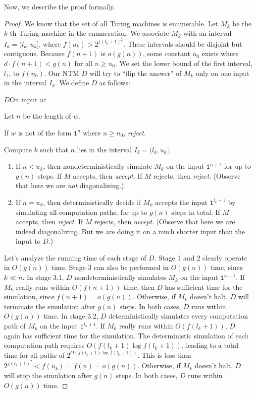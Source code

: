 \documentclass[11pt,twoside=off,numbers=noenddot]{scrbook}
\begin{document}
Now, we describe the proof formally.

\begin{proof}
  We know that the set of all Turing machines is enumerable. Let $M_k$ be the $k$-th Turing machine in the enumeration. We associate $M_k$ with an interval $I_k = (l_k, u_k]$, where $f(u_k) > 2^{f(l_k + 1)^2}$. These intervals should be disjoint but contiguous. Because $f(n + 1)$ is $o(g(n))$, some constant $n_0$ exists where $d \cdot f(n + 1) < g(n)$ for all $n \geq n_0$. We set the lower bound of the first interval, $l_1$, to $f(n_0)$. Our NTM $D$ will try to ``flip the answer'' of $M_k$ only on one input in the interval $I_k$. We define $D$ as follows:

  \begin{turing}{$D$}{On input $w$:}
  \item Let $n$ be the length of $w$.
  \item If $w$ is not of the form $\texttt{1}^n$ where $n \geq n_0$, \emph{reject}.
  \item Compute $k$ such that $n$ lies in the interval $I_k = (l_k, u_k]$.
    \begin{enumerate}[label=\theenumi.\arabic*.]
      \item If $n < u_k$, then nondeterministically simulate $M_k$ on the input $\texttt{1}^{n + 1}$ for up to $g(n)$ steps. If $M$ accepts, then \emph{accept}. If $M$ rejects, then \emph{reject}. (Observe that here we are \emph{not} diagonalizing.)
      \item If $n = u_k$, then deterministically decide if $M_k$ accepts the input $\texttt{1}^{l_k + 1}$ by simulating all computation paths, for up to $g(n)$ steps in total. If $M$ accepts, then \emph{reject}. If $M$ rejects, then \emph{accept}. (Observe that here we are indeed diagonalizing. But we are doing it on a much shorter input than the input to $D$.)
    \end{enumerate}
  \end{turing}

  Let's analyze the running time of each stage of $D$. Stage 1 and 2 clearly operate in $O(g(n))$ time. Stage 3 can also be performed in $O(g(n))$ time, since $k \ll n$. In stage 3.1, $D$ nondeterministically simulates $M_k$ on the input $\texttt{1}^{n + 1}$. If $M_k$ really runs within $O(f(n + 1))$ time, then $D$ has sufficient time for the simulation, since $f(n + 1) = o(g(n))$. Otherwise, if $M_k$ doesn't halt, $D$ will terminate the simulation after $g(n)$ steps. In both cases, $D$ runs within $O(g(n))$ time. In stage 3.2, $D$ deterministically simulates every computation path of $M_k$ on the input $\texttt{1}^{l_k + 1}$. If $M_k$ really runs within $O(f(l_k + 1))$, $D$ again has sufficient time for the simulation. The deterministic simulation of each computation path requires $O(f(l_k + 1) \log f(l_k + 1))$, leading to a total time for all paths of $2^{O(f(l_k + 1) \log f(l_k + 1))}$. This is less than $2^{f(l_k + 1)^2} < f(u_k) = f(n) = o(g(n))$. Otherwise, if $M_k$ doesn't halt, $D$ will stop the simulation after $g(n)$ steps. In both cases, $D$ runs within $O(g(n))$ time.


\end{proof}
\end{document}
